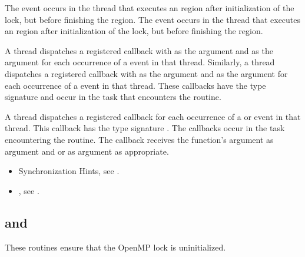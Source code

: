 \events
The  event occurs in the thread that executes an 
 region after initialization of the 
lock, but before finishing the region. The  
event occurs in the thread that executes an  
region after initialization of the lock, but before finishing the region.

\tools
A thread dispatches a registered  
callback with  as the  argument 
and  as the  argument for each 
occurrence of a  event in that thread. Similarly, 
a thread dispatches a registered  
callback with  as the  argument 
and  as the  argument for each 
occurrence of a  event in that thread. These 
callbacks have the type signature 
and occur in the task that encounters the routine.

A thread dispatches a registered 
callback for each occurrence of a  or  
event in that thread.  This callback has the type signature 
.
The callbacks occur in the task encountering the routine.
The callback receives the function's  argument as
 argument and  or
  as  argument as appropriate.

\crossreferences
\begin{itemize}
\item Synchronization Hints, see .

\item {}, see
.
\end{itemize}



\subsection[\hcode{omp_destroy_lock} and \hcode{omp_destroy_nest_lock}]{ and\\ }
\label{subsec:omp_destroy_lock and omp_destroy_nest_lock}
\summary
These routines ensure that the OpenMP lock is uninitialized.

